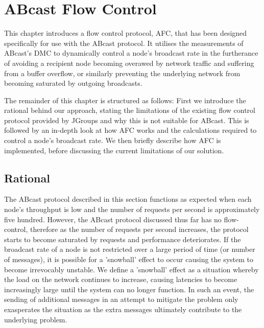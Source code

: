 \chapter{ABcast Flow Control}

    \graphicspath{{Chapter5-FlowControl/Figs/Vector/}{Chapter5-FlowControl/Figs/}}

This chapter introduces a flow control protocol, AFC, that has been designed specifically for use with the \textsf{ABcast} protocol.  It utilises the measurements of \textsf{ABcast}'s DMC to dynamically control a node's broadcast rate in the furtherance of avoiding a recipient node becoming overawed by network traffic and suffering from a buffer overflow, or similarly preventing the underlying network from becoming saturated by outgoing broadcasts.  

The remainder of this chapter is structured as follows: First we introduce the rational behind our approach, stating the limitations of the existing flow control protocol provided by JGroups and why this is not suitable for \textsf{ABcast}.  This is followed by an in-depth look at how AFC works and the calculations required to control a node's broadcast rate.  We then briefly describe how AFC is implemented, before discussing the current limitations of our solution.  

\section{Rational}
The \textsf{ABcast} protocol described in this section functions as expected when each node's throughput is low and the number of requests per second is approximately five hundred.  However, the \textsf{ABcast} protocol discussed thus far has no flow-control, therefore as the number of requests per second increases, the protocol starts to become saturated by requests and performance deteriorates.  If the broadcast rate of a node is not restricted over a large period of time (or number of messages), it is possible for a 'snowball' effect to occur causing the system to become irrevocably unstable.  We define a 'snowball' effect as a situation whereby the load on the network continues to increase, causing latencies to become increasingly large until the system can no longer function.  In such an event, the sending of additional messages in an attempt to mitigate the problem only exasperates the situation as the extra messages ultimately contribute to the underlying problem.  

